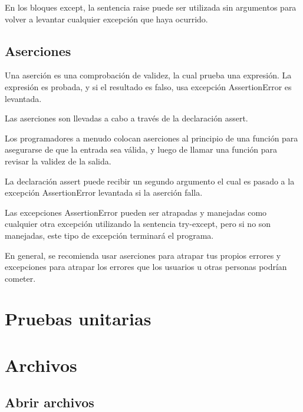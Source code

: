 \documentclass{report}
\begin{document}
En los bloques except, la sentencia raise puede ser utilizada sin argumentos para volver a levantar cualquier excepción que haya ocurrido.


\section{Aserciones}

Una aserción es una comprobación de validez, la cual prueba una expresión. La expresión es probada, y si el resultado es falso, usa excepción AssertionError es levantada.\smallskip

Las aserciones son llevadas a cabo a través de la declaración assert.


Los programadores a menudo colocan aserciones al principio de una función para asegurarse de que la entrada sea válida, y luego de llamar una función para revisar la validez de la salida.\smallskip

La declaración assert puede recibir un segundo argumento el cual es pasado a la excepción AssertionError levantada si la aserción falla.


Las excepciones AssertionError pueden ser atrapadas y manejadas como cualquier otra excepción utilizando la sentencia try-except, pero si no son manejadas, este tipo de excepción terminará el programa.\smallskip

En general, se recomienda usar aserciones para atrapar tus propios errores y excepciones para atrapar los errores que los usuarios u otras personas podrían cometer.


\clearpage\chapter{Pruebas unitarias}

\clearpage\chapter{Archivos}

\section{Abrir archivos}
\end{document}
